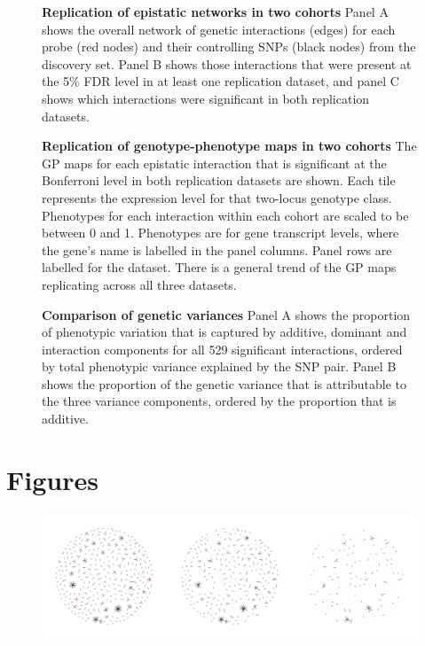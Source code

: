 \documentclass{article}
\begin{document}
\begin{figure}[H]
	\caption{\textbf{Replication of epistatic networks in two cohorts} Panel A shows the overall network of genetic interactions (edges) for each probe (red nodes) and their controlling SNPs (black nodes) from the discovery set. Panel B shows those interactions that were present at the 5\% FDR level in at least one replication dataset, and panel C shows which interactions were significant in both replication datasets.}
	\label{fig:fireworks}
\end{figure}

\begin{figure}[H]
	\caption{\textbf{Replication of genotype-phenotype maps in two cohorts} The GP maps for each epistatic interaction that is significant at the Bonferroni level in both replication datasets are shown. Each tile represents the expression level for that two-locus genotype class. Phenotypes for each interaction within each cohort are scaled to be between 0 and 1. Phenotypes are for gene transcript levels, where the gene's name is labelled in the panel columns. Panel rows are labelled for the dataset. There is a general trend of the GP maps replicating across all three datasets.}
	\label{fig:gpmaps}
\end{figure}

\begin{figure}[H]
	\caption{\textbf{Comparison of genetic variances} Panel A shows the proportion of phenotypic variation that is captured by additive, dominant and interaction components for all 529 significant interactions, ordered by total phenotypic variance explained by the SNP pair. Panel B shows the proportion of the genetic variance that is attributable to the three variance components, ordered by the proportion that is additive.}
	\label{fig:variancecomponents}
\end{figure}


\clearpage
\section{Figures}
\setcounter{figure}{0}

\begin{figure}[H]
	\centering
	\includegraphics[width=5in]{hairballs_all_reps.pdf}
	\caption{}
\end{figure}
\clearpage
\end{document}
